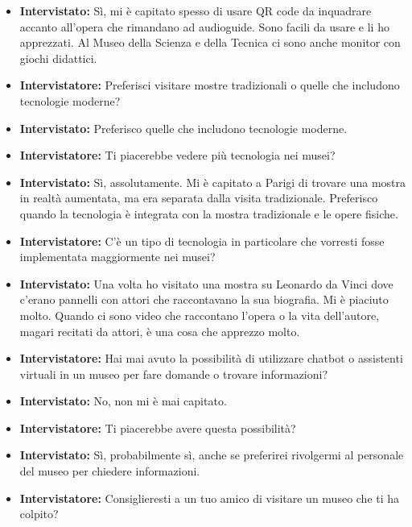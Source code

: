 \documentclass{article}
\begin{document}
\begin{itemize}
    \item \textbf{Intervistato:} Sì, mi è capitato spesso di usare QR code da inquadrare accanto all’opera che rimandano ad audioguide. Sono facili da usare e li ho apprezzati. Al Museo della Scienza e della Tecnica ci sono anche monitor con giochi didattici.

    \item \textbf{Intervistatore:} Preferisci visitare mostre tradizionali o quelle che includono tecnologie moderne?

    \item \textbf{Intervistato:} Preferisco quelle che includono tecnologie moderne.

    \item \textbf{Intervistatore:} Ti piacerebbe vedere più tecnologia nei musei?

    \item \textbf{Intervistato:} Sì, assolutamente. Mi è capitato a Parigi di trovare una mostra in realtà aumentata, ma era separata dalla visita tradizionale. Preferisco quando la tecnologia è integrata con la mostra tradizionale e le opere fisiche.

    \item \textbf{Intervistatore:} C’è un tipo di tecnologia in particolare che vorresti fosse implementata maggiormente nei musei?

    \item \textbf{Intervistato:} Una volta ho visitato una mostra su Leonardo da Vinci dove c’erano pannelli con attori che raccontavano la sua biografia. Mi è piaciuto molto. Quando ci sono video che raccontano l’opera o la vita dell’autore, magari recitati da attori, è una cosa che apprezzo molto.

    \item \textbf{Intervistatore:} Hai mai avuto la possibilità di utilizzare chatbot o assistenti virtuali in un museo per fare domande o trovare informazioni?

    \item \textbf{Intervistato:} No, non mi è mai capitato.

    \item \textbf{Intervistatore:} Ti piacerebbe avere questa possibilità?

    \item \textbf{Intervistato:} Sì, probabilmente sì, anche se preferirei rivolgermi al personale del museo per chiedere informazioni.

    \item \textbf{Intervistatore:} Consiglieresti a un tuo amico di visitare un museo che ti ha colpito?


\end{itemize}
\end{document}

